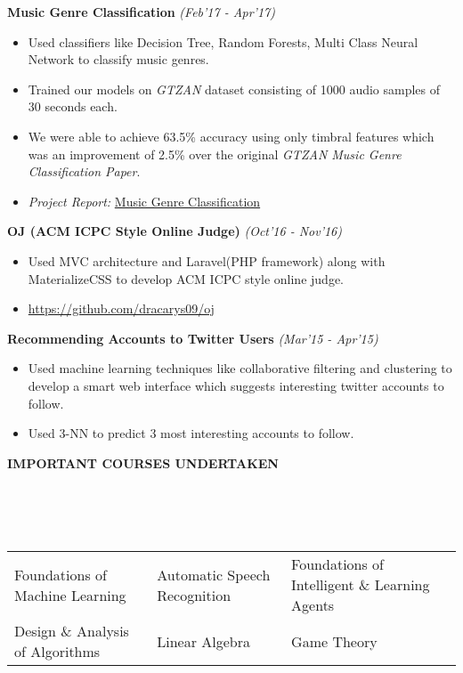 \documentclass[a4paper,10pt]{article}
\newcommand{\lsep}{-0.5cm}
\newcommand{\resheading}[1]{{\small \colorbox{mygrey}{\begin{minipage}{0.975\textwidth}{\textbf{#1 \vphantom{p\^{E}}}}\end{minipage} \hspace{0.2cm}}}}
\begin{document}
\indent\small{\textbf{Music Genre Classification}}	\hfill	\small{\textit{(Feb'17 - Apr'17)}}
\begin{itemize}
 \item Used classifiers like Decision Tree, Random Forests, Multi Class Neural Network to classify music genres. 
 \item Trained our models on \textit{GTZAN} dataset consisting of 1000 audio samples of 30 seconds each.
 \item We were able to achieve 63.5\% accuracy using only timbral features which was an improvement of 2.5\% over the original \textit{GTZAN Music Genre Classification Paper}. 
 \item \textit{Project Report: } \href{https://goo.gl/dTFD85}{Music Genre Classification}
\newline
\newline
\end{itemize}


\indent\small{\textbf{OJ (ACM ICPC Style Online Judge)}}	\hfill	\small{\textit{(Oct'16 - Nov'16)}}
\begin{itemize}
 \item Used MVC architecture and Laravel(PHP framework) along with MaterializeCSS to develop ACM ICPC style online judge.
 \item \href{https://github.com/dracarys09/oj}{https://github.com/dracarys09/oj} 
\end{itemize}

\indent\small{\textbf{Recommending Accounts to Twitter Users}}	\hfill	\small{\textit{(Mar'15 - Apr'15)}}
\begin{itemize}
 \item Used machine learning techniques like collaborative filtering and clustering to develop a smart web interface which suggests interesting twitter accounts to follow.
 \item Used 3-NN to predict 3 most interesting accounts to follow.
\end{itemize}


\resheading{\textbf{IMPORTANT COURSES UNDERTAKEN}}\\[\lsep]
\\ \\
\indent \begin{tabular*}{\textwidth}{@{\extracolsep{\fill}}lll}
Foundations of Machine Learning		&	Automatic Speech Recognition	&	Foundations of Intelligent \& Learning Agents \\
Design \& Analysis of Algorithms	&	Linear Algebra			&	Game Theory
\end{tabular*}
\end{document}
